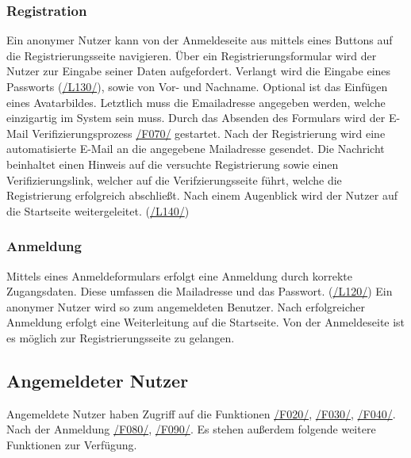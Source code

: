 \subsubsection{Registration}
\begin{description}
     Ein anonymer Nutzer kann von der Anmeldeseite aus mittels eines
    Buttons auf die Registrierungsseite navigieren.
     Über ein Registrierungsformular wird der Nutzer zur Eingabe seiner
    Daten aufgefordert. Verlangt wird die Eingabe eines Passworts (\hyperref[leist:130]{/L130/}),
    sowie von Vor- und Nachname. Optional ist das Einfügen eines Avatarbildes. Letztlich muss die Emailadresse
    angegeben werden, welche einzigartig im System sein muss. Durch das Absenden des Formulars wird der E-Mail Verifizierungsprozess
    \hyperref[funkt:070]{/F070/} gestartet.
     Nach der Registrierung wird eine automatisierte E-Mail
    an die angegebene Mailadresse gesendet. Die Nachricht beinhaltet einen Hinweis auf
    die versuchte Registrierung sowie einen Verifizierungslink, welcher auf die Verifzierungsseite führt, welche
    die Registrierung erfolgreich abschließt. Nach einem Augenblick wird der Nutzer
    auf die Startseite weitergeleitet. (\hyperref[leist:140]{/L140/})
\end{description}

\subsubsection{Anmeldung}
\begin{description}
     Mittels eines Anmeldeformulars erfolgt eine Anmeldung durch korrekte Zugangsdaten.
    Diese umfassen die Mailadresse und das Passwort. (\hyperref[leist:120]{/L120/})
    Ein anonymer Nutzer wird so zum angemeldeten Benutzer.
    Nach erfolgreicher Anmeldung erfolgt eine Weiterleitung auf die Startseite.
     Von der Anmeldeseite ist es möglich zur Registrierungsseite zu gelangen.
\end{description}

\subsection{Angemeldeter Nutzer}
Angemeldete Nutzer haben Zugriff auf die Funktionen
\hyperref[funkt:020]{/F020/}, \hyperref[funkt:030]{/F030/}, \hyperref[funkt:040]{/F040/}.
Nach der Anmeldung \hyperref[funkt:080]{/F080/}, \hyperref[funkt:090]{/F090/}.
Es stehen außerdem folgende weitere Funktionen zur Verfügung.

